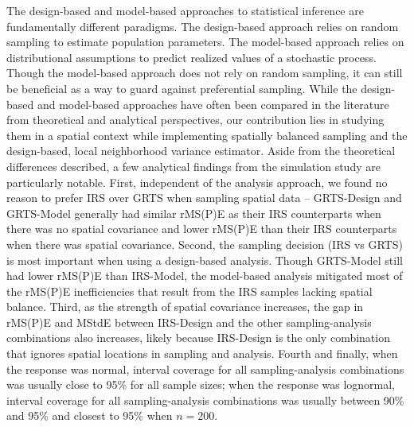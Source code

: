 \documentclass[]{elsarticle} %
\begin{document}
The design-based and model-based approaches to statistical inference are
fundamentally different paradigms. The design-based approach relies on
random sampling to estimate population parameters. The model-based
approach relies on distributional assumptions to predict realized values
of a stochastic process. Though the model-based approach does not rely
on random sampling, it can still be beneficial as a way to guard against
preferential sampling. While the design-based and model-based approaches
have often been compared in the literature from theoretical and
analytical perspectives, our contribution lies in studying them in a
spatial context while implementing spatially balanced sampling and the
design-based, local neighborhood variance estimator. Aside from the
theoretical differences described, a few analytical findings from the
simulation study are particularly notable. First, independent of the
analysis approach, we found no reason to prefer IRS over GRTS when
sampling spatial data -- GRTS-Design and GRTS-Model generally had
similar rMS(P)E as their IRS counterparts when there was no spatial
covariance and lower rMS(P)E than their IRS counterparts when there was
spatial covariance. Second, the sampling decision (IRS vs GRTS) is most
important when using a design-based analysis. Though GRTS-Model still
had lower rMS(P)E than IRS-Model, the model-based analysis mitigated
most of the rMS(P)E inefficiencies that result from the IRS samples
lacking spatial balance. Third, as the strength of spatial covariance
increases, the gap in rMS(P)E and MStdE between IRS-Design and the other
sampling-analysis combinations also increases, likely because IRS-Design
is the only combination that ignores spatial locations in sampling and
analysis. Fourth and finally, when the response was normal, interval
coverage for all sampling-analysis combinations was usually close to
95\% for all sample sizes; when the response was lognormal, interval
coverage for all sampling-analysis combinations was usually between 90\%
and 95\% and closest to 95\% when \(n = 200\).
\end{document}
